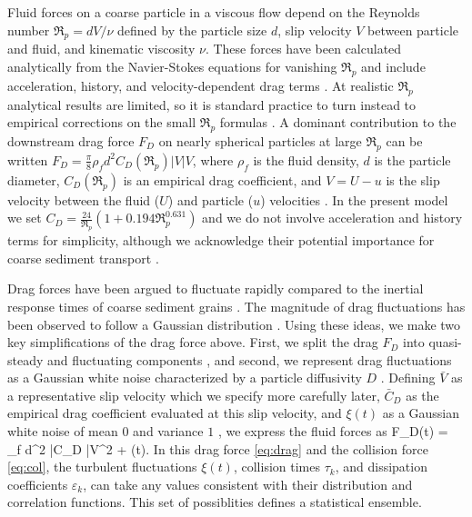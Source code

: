 Fluid forces on a coarse particle in a viscous flow depend on the Reynolds number $\Re_p = d V/\nu$ defined by the particle size $d$, slip velocity $V$ between particle and fluid, and kinematic viscosity $\nu$.
These forces have been calculated analytically from the Navier-Stokes equations for vanishing $\Re_p$ and include acceleration, history, and velocity-dependent drag terms \citep{Hjelmfelt1966, Maxey1983, Auton1987}.
At realistic $\Re_p$ analytical results are limited, so it is standard practice to turn instead to empirical corrections on the small $\Re_p$ formulas \citep{Schmeeckle2007,Mei2006}.
A dominant contribution to the downstream drag force $F_D$ on nearly spherical particles at large $\Re_p$ can be written $F_D = \frac{\pi}{8}
\rho_f d^2 C_D(\Re_p) |V|V$, where $\rho_f$ is the fluid density, $d$ is the particle diameter, $C_D(\Re_p)$ is an empirical drag coefficient, and $V = U-u$ is the slip velocity between the fluid ($U$) and particle ($u$) velocities \citep{Coleman1967, Schmeeckle2007, Dwivedi2012}.
In the present model we set $C_D = \frac{24}{\Re_p}( 1 + 0.194 \Re_p^{0.631})$ \citep{Clift1978,Gonzalez2017} and we do not involve acceleration and history terms for simplicity, although we acknowledge their potential importance for coarse sediment transport \citep{Michaelides1997,Armenio2001,Dalche2015}.

Drag forces have been argued to fluctuate rapidly compared to the inertial response times of coarse sediment grains \citep{Fan2014}.
The magnitude of drag fluctuations has been observed to follow a Gaussian distribution \citep{Hofland2006,Schmeeckle2007,Dwivedi2010,Celik2014}.
Using these ideas, we make two key simplifications of the drag force above.
First, we split the drag $F_D$ into quasi-steady and fluctuating components \citep{Michaelides1997}, and second, we represent drag fluctuations as a Gaussian white noise characterized by a particle diffusivity $D$ \citep{Fan2014,Ancey2014}. 
Defining $\bar{V}$ as a representative slip velocity which we specify more carefully later,  $\bar{C}_D$ as the empirical drag coefficient evaluated at this slip velocity, and $\xi(t)$ as a Gaussian white noise of mean $0$ and variance $1$ \citep{Gardiner1983}, we express the fluid forces as
\be F_D(t) = 
\rho_f d^2 \bar{C}_D \bar{V}^2 +  \eta(t). \ee
In this drag force \ref{eq:drag} and the collision force \ref{eq:col}, the turbulent fluctuations $\xi(t)$, collision times $\tau_k$, and dissipation coefficients $\varepsilon_k$, can take any values consistent with their distribution and correlation functions. This set of possiblities defines a statistical ensemble.

